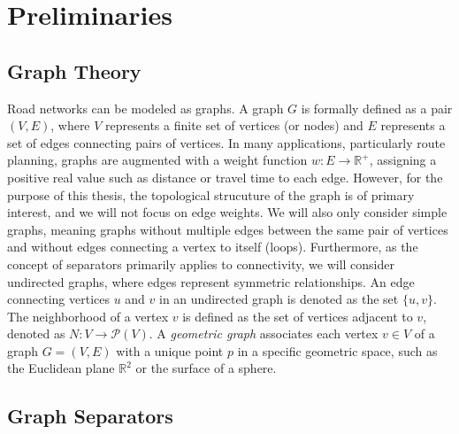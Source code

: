 \chapter{Preliminaries}
\label{ch:preliminaries}

\section{Graph Theory}
\label{sec:graphtheory}

Road networks can be modeled as graphs.
A graph \(G\) is formally defined as a pair \((V, E)\), where \(V\) represents a finite set of vertices (or nodes) and \(E\) represents a set of edges connecting pairs of vertices.
In many applications, particularly route planning, graphs are augmented with a weight function \(w: E \to \mathbb{R}^+\), assigning a positive real value such as distance or travel time to each edge.
However, for the purpose of this thesis, the topological strucuture of the graph is of primary interest, and we will not focus on edge weights.
We will also only consider simple graphs, meaning graphs without multiple edges between the same pair of vertices and without edges connecting a vertex to itself (loops).
Furthermore, as the concept of separators primarily applies to connectivity, we will consider undirected graphs, where edges represent symmetric relationships.
An edge connecting vertices \(u\) and \(v\) in an undirected graph is denoted as the set \(\{u,v\}\).
The neighborhood of a vertex \(v\) is defined as the set of vertices adjacent to \(v\), denoted as \(N : V \to \mathcal{P}(V)\).
A \emph{geometric graph} associates each vertex \(v \in V\) of a graph \(G = (V, E)\) with a unique point \(p\) in a specific geometric space, such as the Euclidean plane \(\mathbb{R}^2\) or the surface of a sphere.

\section{Graph Separators}
\label{sec:graphseparators}

